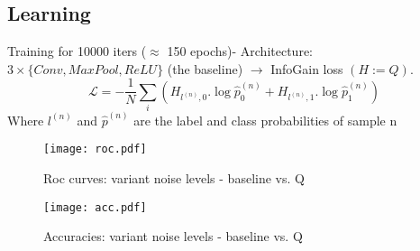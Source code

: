 \documentclass[10pt]{article}
\newcommand{\1}{\mathbbm{1}}
\newcommand{\0}{\mathbf{0}}
\begin{document}
\subsection*{Learning}
Training for 10000 iters ($\approx$ 150 epochs)- Architecture: $3\times\{Conv,MaxPool,ReLU\}$ (the baseline) $\rightarrow$ InfoGain loss $(H:=Q)$.
\[\mathcal L=-\frac{1}{N}\sum_i\left(H_{l^{(n)},0}.\log\hat p_0^{(n)}+H_{l^{(n)},1}.\log\hat p_1^{(n)}\right)\]
Where $l^{(n)}$ and $\hat p^{(n)}$ are the label and class probabilities of sample n

\begin{figure}[H]
    \centering
    \texttt{[image: roc.pdf]}
    \caption{Roc curves: variant noise levels - baseline vs. Q}
\end{figure}

\begin{figure}[H]
    \centering
    \texttt{[image: acc.pdf]}
    \caption{Accuracies: variant noise levels - baseline vs. Q}
\end{figure}

\newpage
\end{document}
